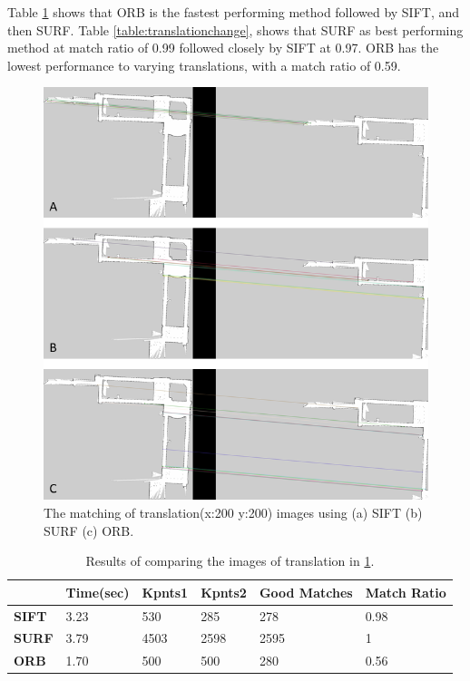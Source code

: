 Table \ref{table:translation} shows that ORB is the fastest performing method followed by SIFT, and then SURF. Table \ref{table:translationchange}, shows that SURF as best performing method at match ratio of 0.99 followed closely by SIFT at 0.97. ORB has the lowest performance to varying translations, with a match ratio of 0.59.

\begin{figure}[H]
    \centering
    \includegraphics[width=1\textwidth]{figs/The_matching_of_translation_200.png}
    \caption{ The matching of translation(x:200 y:200) images using (a) SIFT (b) SURF (c) ORB.}
    \label{fig:translation}
\end{figure}

\begin{table}[H]
\centering
\caption{Results of comparing the images of translation in \ref{fig:translation}.}
\begin{tabular}{ | m{3em} | m{2cm} | m{1.5cm} | m{1.5cm} | m{1.5cm} | m{3cm} | } 
\hline
& \textbf{Time(sec)} & \textbf{Kpnts1}  & \textbf{Kpnts2} & \textbf{Good Matches} & \textbf{Match Ratio}\\ 
\hline
\textbf{SIFT}  & 3.23 & 530 & 285 & 278 & 0.98\\ 
\hline
\textbf{SURF}  & 3.79 & 4503 & 2598 & 2595 & 1\\ 
\hline
\textbf{ORB}  & 1.70 & 500 & 500 & 280 & 0.56\\ 
\hline
\end{tabular}
\label{table:translation}
\end{table}



